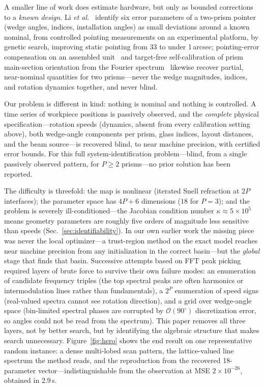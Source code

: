 \documentclass[twocolumn,preprintnumbers,amsmath,amssymb,pra,floatfix]{revtex4-2}
\newcommand{\bigO}{\mathcal{O}}
\begin{document}
A smaller line of work does estimate hardware, but only as bounded
corrections to a \emph{known design}.  Li \emph{et al.}~\cite{Li2017}
identify six error parameters of a two-prism pointer (wedge angles,
indices, installation angles) as small deviations around a known
nominal, from controlled pointing measurements on an experimental
platform, by genetic search, improving static pointing from 33 to under
1\,arcsec; pointing-error compensation on an assembled
unit~\cite{BravoMedina2017} and target-free self-calibration of prism
main-section orientation from the Fourier spectrum~\cite{LiZhou2021}
likewise recover partial, near-nominal quantities for two
prisms---never the wedge magnitudes, indices, and rotation dynamics
together, and never blind.

Our problem is different in kind: nothing is nominal and nothing is
controlled.  A time series of workpiece positions is passively observed,
and the \emph{complete} physical specification---rotation speeds
(dynamics, absent from every calibration setting above), both
wedge-angle components per prism, glass indices, layout distances, and
the beam source---is recovered blind, to near machine precision, with
certified error bounds.  For this full system-identification
problem---blind, from a single passively observed pattern, for
$P\ge2$ prisms---no prior solution has been reported.

The difficulty is threefold: the map is nonlinear (iterated Snell
refraction at $2P$ interfaces); the parameter space has $4P+6$
dimensions ($18$ for $P{=}3$); and the problem is severely
ill-conditioned---the Jacobian condition number
$\kappa\approx5\times10^{5}$ means geometry parameters are
roughly five orders of magnitude less sensitive than speeds
(Sec.~\ref{sec:identifiability}).  In our own earlier work the missing
piece was never the local optimizer---a trust-region method on the
exact model reaches near machine precision from any initialization in the
correct basin---but the \emph{global} stage that finds that basin.
Successive attempts based on FFT peak picking required layers of brute
force to survive their own failure modes: an enumeration of candidate
frequency triples (the top spectral peaks are often harmonics or
intermodulation lines rather than fundamentals), a $2^P$ enumeration of
speed signs (real-valued spectra cannot see rotation direction), and a
grid over wedge-angle space (bin-limited spectral phases are corrupted
by $\bigO(90^\circ)$ discretization error, so angles could not be read
from the spectrum).  This paper removes all three layers, not by better
search, but by identifying the algebraic structure that makes search
unnecessary.  Figure~\ref{fig:hero} shows the end result on one
representative random instance: a dense multi-lobed scan pattern, the lattice-valued
line spectrum the method reads, and the reproduction from the
recovered 18-parameter vector---indistinguishable from the observation
at MSE $2\times10^{-26}$, obtained in $2.9$\,s.
\end{document}

